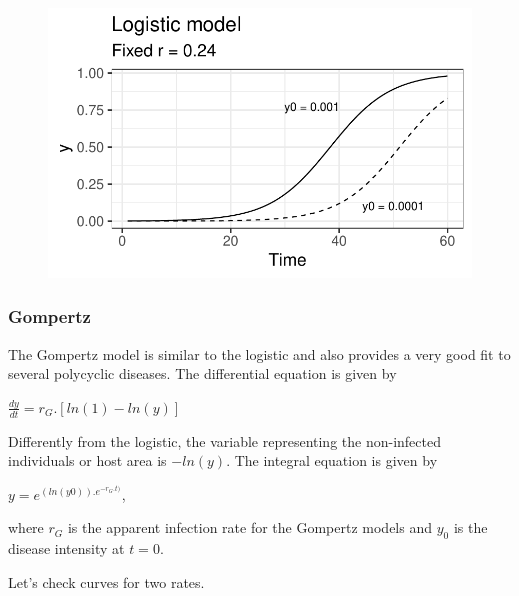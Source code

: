 \documentclass[
  letterpaper,
  DIV=11,
  numbers=noendperiod]{scrreprt}
\begin{document}
\begin{figure}[H]

{\centering \includegraphics{./temporal-models_files/figure-pdf/unnamed-chunk-16-1.pdf}

}

\end{figure}

\hypertarget{gompertz}{%
\subsubsection{Gompertz}\label{gompertz}}

The Gompertz model is similar to the logistic and also provides a very
good fit to several polycyclic diseases. The differential equation is
given by

\(\frac{dy}{dt} = r_G.[ln(1) - ln(y)]\)

Differently from the logistic, the variable representing the
non-infected individuals or host area is \(-ln(y)\). The integral
equation is given by

\(y = e^{(ln(y0)).{e^{-r_G.t)}}}\),

where \(r_G\) is the apparent infection rate for the Gompertz models and
\(y_0\) is the disease intensity at \(t = 0\).

Let's check curves for two rates.
\end{document}
